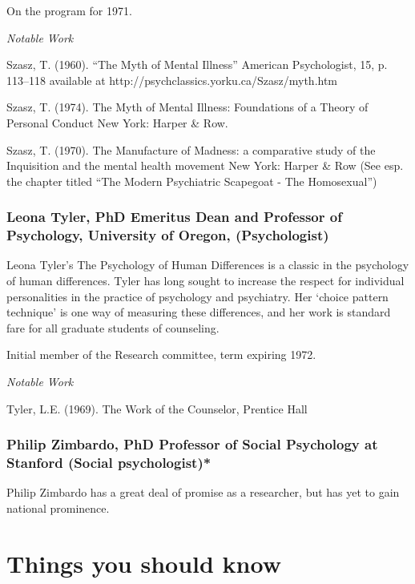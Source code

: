 \begin{refsection}
On the program for 1971.

\emph{Notable Work}

Szasz, T. (1960). ``The Myth of Mental Illness'' American Psychologist, 15, p. 113--118 available at http:\slash \slash psychclassics.yorku.ca\slash Szasz\slash myth.htm

Szasz, T. (1974). The Myth of Mental Illness: Foundations of a Theory of Personal Conduct New York: Harper \& Row.

Szasz, T. (1970). The Manufacture of Madness: a comparative study of the Inquisition and the mental health movement New York: Harper \& Row (See esp. the chapter titled ``The Modern Psychiatric Scapegoat - The Homosexual'')

\subsubsection{Leona Tyler, PhD Emeritus Dean and Professor of Psychology, University of Oregon, (Psychologist)}
\label{leonatylerphdemeritusdeanandprofessorofpsychologyuniversityoforegonpsychologist}

Leona Tyler's The Psychology of Human Differences is a classic in the psychology of human differences. Tyler has long sought to increase the respect for individual personalities in the practice of psychology and psychiatry. Her `choice pattern technique' is one way of measuring these differences, and her work is standard fare for all graduate students of counseling.

Initial member of the Research committee, term expiring 1972.

\emph{Notable Work}

Tyler, L.E. (1969). The Work of the Counselor, Prentice Hall

\subsubsection{Philip Zimbardo, PhD Professor of Social Psychology at Stanford (Social psychologist)*}
\label{philipzimbardophdprofessorofsocialpsychologyatstanfordsocialpsychologist}

Philip Zimbardo has a great deal of promise as a researcher, but has yet to gain national prominence.

\section{Things you should know}
\label{thingsyoushouldknow}


\end{refsection}
